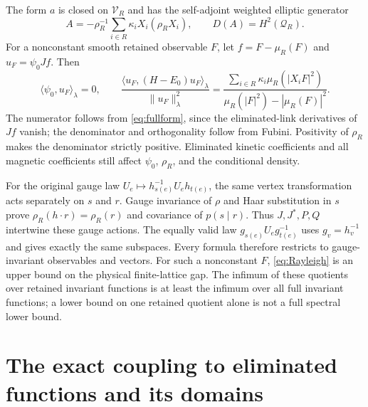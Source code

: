 \documentclass[11pt]{article}
\begin{document}
The form $a$ is closed on $\mathcal V_R$ and has the self-adjoint
weighted elliptic generator
\begin{equation}\label{eq:A}
 A=-\rho_R^{-1}\sum_{i\in R}\kappa_iX_i(\rho_RX_i),
 \qquad D(A)=H^2(\mathcal Q_R).
\end{equation}
For a nonconstant smooth retained observable $F$, let
$f=F-\mu_R(F)$ and $u_F=\psi_0Jf$. Then
\begin{equation}\label{eq:Rayleigh}
 \langle\psi_0,u_F\rangle_\lambda=0,\qquad
 \frac{\langle u_F,(H-E_0)u_F\rangle_\lambda}{\|u_F\|_\lambda^2}
 =\frac{\displaystyle\sum_{i\in R}\kappa_i\mu_R(|X_iF|^2)}
        {\displaystyle\mu_R(|F|^2)-|\mu_R(F)|^2}.
\end{equation}
The numerator follows from \eqref{eq:fullform}, since the eliminated-link
derivatives of $Jf$ vanish; the denominator and orthogonality follow
from Fubini. Positivity of $\rho_R$ makes the denominator strictly
positive. Eliminated kinetic coefficients and all magnetic coefficients
still affect $\psi_0$, $\rho_R$, and the conditional density.

For the original gauge law $U_e\mapsto h_{s(e)}^{-1}U_eh_{t(e)}$,
the same vertex transformation acts separately on $s$ and $r$.
Gauge invariance of $\rho$ and Haar substitution in $s$ prove
$\rho_R(h\cdot r)=\rho_R(r)$ and covariance of $p(s\mid r)$.
Thus $J,J^*,P,Q$ intertwine these gauge actions. The equally valid law
$g_{s(e)}U_eg_{t(e)}^{-1}$ uses $g_v=h_v^{-1}$ and gives exactly the
same subspaces. Every formula therefore restricts to gauge-invariant
observables and vectors. For such a nonconstant $F$, \eqref{eq:Rayleigh}
is an upper bound on the physical finite-lattice gap. The infimum of
these quotients over retained invariant functions is at least the
infimum over all full invariant functions; a lower bound on one
retained quotient alone is not a full spectral lower bound.

\section{The exact coupling to eliminated functions and its domains}
\end{document}
